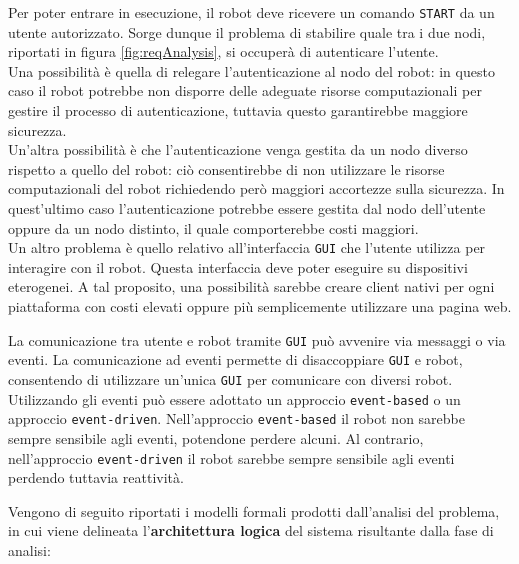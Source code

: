 \documentclass{llncs}
\newcommand{\action}[1]{\texttt{#1}\xspace}
\newcommand{\code}[1]{{\color{blue}\small{\texttt{#1}}}}
\begin{document}
Per poter entrare in esecuzione, il robot deve ricevere un comando \action{START} da un utente autorizzato. Sorge dunque il problema di stabilire quale tra i due nodi, riportati in figura \ref{fig:reqAnalysis}, si occuperà di autenticare l'utente. \\ Una possibilità è quella di relegare l'autenticazione al nodo del robot: in questo caso il robot potrebbe non disporre delle adeguate risorse computazionali per gestire il processo di autenticazione, tuttavia questo garantirebbe maggiore sicurezza. \\ Un'altra possibilità è che l'autenticazione venga gestita da un nodo diverso rispetto a quello del robot: ciò consentirebbe di non utilizzare le risorse computazionali del robot richiedendo però maggiori accortezze sulla sicurezza. In quest'ultimo caso l'autenticazione potrebbe essere gestita dal nodo dell'utente oppure da un nodo distinto, il quale comporterebbe costi maggiori. \\

Un altro problema è quello relativo all'interfaccia \action{GUI} che l'utente utilizza per interagire con il robot. Questa interfaccia deve poter eseguire su dispositivi eterogenei. A tal proposito, una possibilità sarebbe creare client nativi per ogni piattaforma con costi elevati oppure più semplicemente utilizzare una pagina web. 

La comunicazione tra utente e robot tramite \action{GUI} può avvenire via messaggi o via eventi. La comunicazione ad eventi permette di disaccoppiare \action{GUI} e robot, consentendo di utilizzare un'unica \action{GUI} per comunicare con diversi robot. Utilizzando gli eventi può essere adottato un approccio \code{event-based} o un approccio \code{event-driven}. Nell'approccio \code{event-based} il robot non sarebbe sempre sensibile agli eventi, potendone perdere alcuni. Al contrario, nell'approccio \code{event-driven} il robot sarebbe sempre sensibile agli eventi perdendo tuttavia reattività.


Vengono di seguito riportati i modelli formali prodotti dall'analisi del problema, in cui viene delineata l'\textbf{architettura logica} del sistema risultante dalla fase di analisi: 



\end{document}
